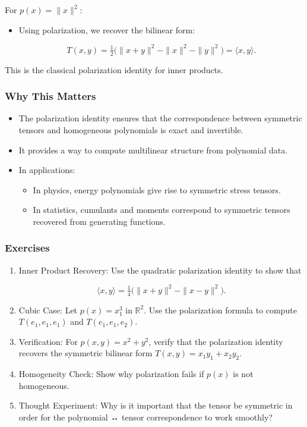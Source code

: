 \documentclass[
  letterpaper,
  DIV=11,
  numbers=noendperiod]{scrreprt}
\providecommand{\tightlist}{%
  \setlength{\itemsep}{0pt}\setlength{\parskip}{0pt}}
\begin{document}
For \(p(x) = \|x\|^2\):

\begin{itemize}
\item
  Using polarization, we recover the bilinear form:

  \[
  T(x,y) = \tfrac{1}{2} \big( \|x+y\|^2 - \|x\|^2 - \|y\|^2 \big) = \langle x,y \rangle.
  \]
\end{itemize}

This is the classical polarization identity for inner products.

\subsubsection{Why This Matters}\label{why-this-matters-25}

\begin{itemize}
\item
  The polarization identity ensures that the correspondence between
  symmetric tensors and homogeneous polynomials is exact and invertible.
\item
  It provides a way to compute multilinear structure from polynomial
  data.
\item
  In applications:

  \begin{itemize}
  \tightlist
  \item
    In physics, energy polynomials give rise to symmetric stress
    tensors.
  \item
    In statistics, cumulants and moments correspond to symmetric tensors
    recovered from generating functions.
  \end{itemize}
\end{itemize}

\subsubsection{Exercises}\label{exercises-37}

\begin{enumerate}
\def\labelenumi{\arabic{enumi}.}
\item
  Inner Product Recovery: Use the quadratic polarization identity to
  show that

  \[
  \langle x,y \rangle = \tfrac{1}{4} \big( \|x+y\|^2 - \|x-y\|^2 \big).
  \]
\item
  Cubic Case: Let \(p(x) = x_1^3\) in \(\mathbb{R}^2\). Use the
  polarization formula to compute \(T(e_1,e_1,e_1)\) and
  \(T(e_1,e_1,e_2)\).
\item
  Verification: For \(p(x,y) = x^2 + y^2\), verify that the polarization
  identity recovers the symmetric bilinear form
  \(T(x,y) = x_1y_1 + x_2y_2\).
\item
  Homogeneity Check: Show why polarization fails if \(p(x)\) is not
  homogeneous.
\item
  Thought Experiment: Why is it important that the tensor be symmetric
  in order for the polynomial ↔ tensor correspondence to work smoothly?
\end{enumerate}
\end{document}
